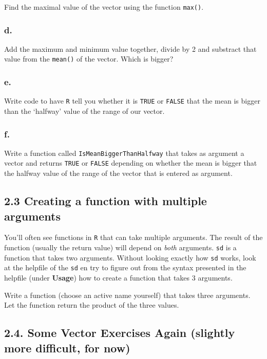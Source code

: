 \documentclass[]{article}
\begin{document}
Find the maximal value of the vector using the function \texttt{max()}.

\hypertarget{d.-2}{%
\subsubsection{d.}\label{d.-2}}

Add the maximum and minimum value together, divide by 2 and substract
that value from the \texttt{mean()} of the vector. Which is bigger?

\hypertarget{e.-2}{%
\subsubsection{e.}\label{e.-2}}

Write code to have \texttt{R} tell you whether it is \texttt{TRUE} or
\texttt{FALSE} that the mean is bigger than the `halfway' value of the
range of our vector.

\hypertarget{f.-1}{%
\subsubsection{f.}\label{f.-1}}

Write a function called \texttt{IsMeanBiggerThanHalfway} that takes as
argument a vector and returns \texttt{TRUE} or \texttt{FALSE} depending
on whether the mean is bigger that the halfway value of the range of the
vector that is entered as argument.

\hypertarget{creating-a-function-with-multiple-arguments}{%
\subsection{2.3 Creating a function with multiple
arguments}\label{creating-a-function-with-multiple-arguments}}

You'll often see functions in \texttt{R} that can take multiple
arguments. The result of the function (usually the return value) will
depend on \emph{both} arguments. \texttt{sd} is a function that takes
two arguments. Without looking exactly how \texttt{sd} works, look at
the helpfile of the \texttt{sd} en try to figure out from the syntax
presented in the helpfile (under \textbf{Usage}) how to create a
function that takes 3 arguments.

Write a function (choose an active name yourself) that takes three
arguments. Let the function return the product of the three values.

\hypertarget{some-vector-exercises-again-slightly-more-difficult-for-now}{%
\subsection{2.4. Some Vector Exercises Again (slightly more difficult,
for
now)}\label{some-vector-exercises-again-slightly-more-difficult-for-now}}
\end{document}
